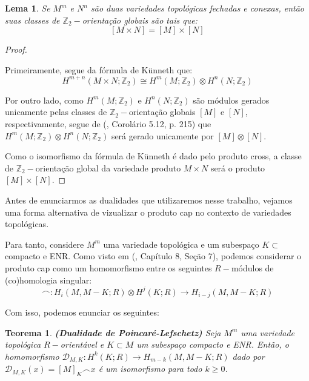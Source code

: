 \documentclass[12pt,oneside]{book} %
\newtheorem{teo}    {\hspace{0.5cm}Teorema}[chapter]
\newtheorem{lem}    {\hspace{0.5cm}Lema}[chapter]
\newcommand{\Z}{\mathbb{Z}}
\newcommand{\ccap}{\frown}
\newcommand{\tensor}{\otimes}
\begin{document}
\begin{lem}
	Se $M^{m}$ e $N^{n}$ são duas variedades topológicas fechadas e conexas, então suas classes de $\Z_{2}-$orientação globais são tais que: 
	$$ [M\times N]=[M]\times [N] $$
\end{lem}
\begin{proof}
	
	\
	
	\par Primeiramente, segue da fórmula de Künneth que:
	$$ H^{m+n}(M\times N;\Z_{2})\cong H^{m}(M;\Z_{2})\otimes H^{n}(N;\Z_{2}) $$
	
	\par Por outro lado, como $H^{m}(M;\Z_{2})$ e $H^{n}(N;\Z_{2})$ são módulos gerados unicamente pelas classes de $\Z_{2}-$orientação globais $[M]$ e $[N]$, respectivamente, segue de (\cite{hungerford}, Corolário 5.12, p. 215) que $H^{m}(M;\Z_{2})\otimes H^{n}(N;\Z_{2})$ será gerado unicamente por $[M]\otimes [N]$.
	
	\par Como o isomorfismo da fórmula de Künneth é dado pelo produto cross, a classe de $\Z_{2}-$orientação global da variedade produto $M\times N$ será o produto $[M]\times [N]$.
	
\end{proof}

\par Antes de enunciarmos as dualidades que utilizaremos nesse trabalho, vejamos uma forma alternativa de vizualizar o produto cap  no contexto de variedades topológicas.

\par Para tanto, considere $M^{m}$ uma variedade topológica e um subespaço $K\subset$ compacto e ENR. Como visto em (\cite{dold}, Capítulo 8, Seção 7), podemos considerar o produto cap como um homomorfismo entre os seguintes $R-$módulos de (co)homologia singular:
$$ \ccap:H_{i}(M,M-K;R)\tensor H^{j}(K;R) \to H_{i-j}(M,M-K;R)$$

\par Com isso, podemos enunciar os seguintes:

\begin{teo}{\bf (Dualidade de Poincaré-Lefschetz)}
	Seja $M^{m}$ uma variedade topológica $R-$orientável e $K\subset M$ um subespaço compacto e ENR. Então, o homomorfismo $\mathcal{D}_{M,K}:H^{k}(K;R)\to H_{m-k}(M,M-K;R)$ dado por $\mathcal{D}_{M,K}(x)=[M]_{K}\ccap x$ é um isomorfismo para todo $k\geq 0$.
\end{teo}
\end{document}
